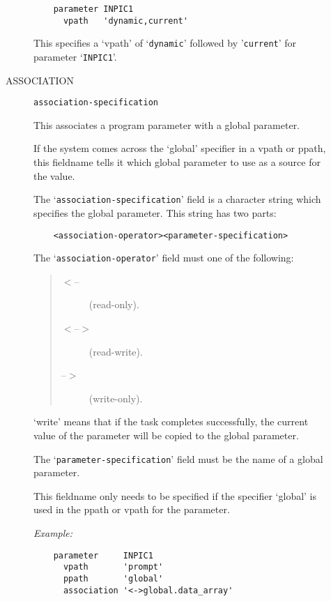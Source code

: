 \begin{description}
\begin{description}
\begin{small}
\begin{verbatim}
    parameter INPIC1
      vpath   'dynamic,current'
\end{verbatim}
\end{small}

This specifies a `vpath' of `\verb+dynamic+' followed by '\verb+current+'
for parameter `\verb+INPIC1+'.

\item [ASSOCIATION] {\tt association-specification}

This associates a program parameter with a global parameter.

If the system comes across the `global' specifier in a vpath or ppath, this
fieldname tells it which global parameter to use as a source for the value.

The `\verb+association-specification+' field is a character string which
specifies the global parameter.
This string has two parts:

\begin{small}
\begin{verbatim}
    <association-operator><parameter-specification>
\end{verbatim}
\end{small}

The `\verb+association-operator+' field must one of the following:
\begin{quote}
\begin{description}
\item [$<$--] (read-only).
\item [$<$--$>$] (read-write).
\item [--$>$] (write-only).
\end{description}
\end{quote}
`write' means that if the task completes successfully, the current value of the
parameter will be copied to the global parameter.

The `\verb+parameter-specification+' field must be the name of a global
parameter.

This fieldname only needs to be specified if the specifier `global' is used in
the ppath or vpath for the parameter.

{\em Example:}

\begin{small}
\begin{verbatim}
    parameter     INPIC1
      vpath       'prompt'
      ppath       'global'
      association '<->global.data_array'
\end{verbatim}
\end{small}


\end{description}
\end{description}
